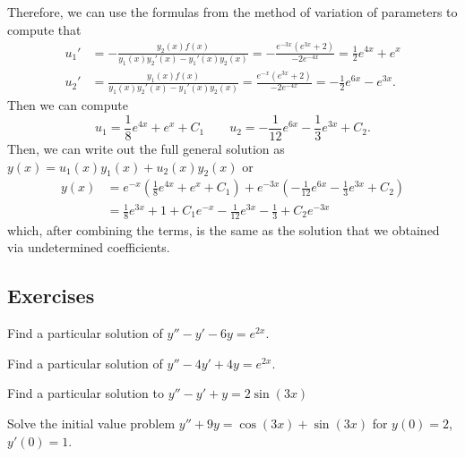 \begin{exampleSol}
Therefore, we can use the formulas from the method of variation of parameters to compute that
\begin{equation*}
\begin{split}
u_1' &= -\frac{y_2(x)f(x)}{y_1(x)y_2'(x) - y_1'(x)y_2(x)} = -\frac{e^{-3x}(e^{3x} + 2)}{-2e^{-4x}} = \frac{1}{2}e^{4x} + e^x \\
u_2' &= \frac{y_1(x)f(x)}{y_1(x)y_2'(x) - y_1'(x)y_2(x)} = \frac{e^{-x}(e^{3x} + 2)}{-2e^{-4x}} = -\frac{1}{2}e^{6x} - e^{3x}.
\end{split}
\end{equation*} 
Then we can compute
\begin{equation*}
u_1 = \frac{1}{8}e^{4x} + e^x + C_1 \qquad u_2 = -\frac{1}{12}e^{6x} - \frac{1}{3}e^{3x} + C_2.
\end{equation*}
Then, we can write out the full general solution as $y(x) = u_1(x)y_1(x) + u_2(x)y_2(x)$ or
\begin{equation*}
\begin{split}
y(x) &= e^{-x}\left( \frac{1}{8}e^{4x} + e^x + C_1 \right) + e^{-3x}\left(-\frac{1}{12}e^{6x} - \frac{1}{3}e^{3x} + C_2 \right) \\
&= \frac{1}{8}e^{3x} + 1 + C_1e^{-x} - \frac{1}{12}e^{3x} - \frac{1}{3} + C_2e^{-3x}
\end{split}
\end{equation*}
which, after combining the terms, is the same as the solution that we obtained via undetermined coefficients.
\end{exampleSol}

\subsection{Exercises}

\begin{exercise}
Find a particular solution of
$y''-y' -6y = e^{2x}$.
\end{exercise}

\begin{exercise}
Find a particular solution of
$y''-4y' +4y = e^{2x}$.
\end{exercise}

\begin{exercise}\ansMark%
Find a particular solution to $y''-y'+y=2\sin(3x)$
\end{exercise}

\begin{exercise}
Solve the initial value problem
$y''+9y = \cos (3x) + \sin (3x)$ for $y(0) = 2$, $y'(0) = 1$.
\end{exercise}

